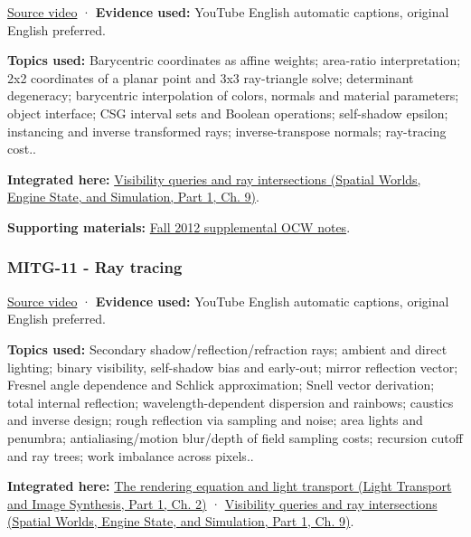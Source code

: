 \href{https://www.youtube.com/watch?v=gDayCevuE-U}{Source video} · \textbf{Evidence used:} YouTube English automatic captions, original English preferred.

\textbf{Topics used:} Barycentric coordinates as affine weights; area-ratio interpretation; 2x2 coordinates of a planar point and 3x3 ray-triangle solve; determinant degeneracy; barycentric interpolation of colors, normals and material parameters; object interface; CSG interval sets and Boolean operations; self-shadow epsilon; instancing and inverse transformed rays; inverse-transpose normals; ray-tracing cost..

\textbf{Integrated here:} \href{../05-Spatial-Worlds-Engine-State-and-Simulation-P01/main.pdf\#04-visual-computing-ii-ch028-visibility-queries-and-ray-intersections-1}{Visibility queries and ray intersections (Spatial Worlds, Engine State, and Simulation, Part 1, Ch. 9)}.

\textbf{Supporting materials:} \href{https://ocw.mit.edu/courses/6-837-computer-graphics-fall-2012/pages/lecture-notes/}{Fall 2012 supplemental OCW notes}.

\subsubsection{MITG-11 - Ray tracing}\label{04-visual-computing-ii-ch036-mitg-11---ray-tracing}

\hypertarget{04-visual-computing-ii-ch036-mitg-11---ray-tracing}{}

\href{https://www.youtube.com/watch?v=UL54Rf2O9RM}{Source video} · \textbf{Evidence used:} YouTube English automatic captions, original English preferred.

\textbf{Topics used:} Secondary shadow/reflection/refraction rays; ambient and direct lighting; binary visibility, self-shadow bias and early-out; mirror reflection vector; Fresnel angle dependence and Schlick approximation; Snell vector derivation; total internal reflection; wavelength-dependent dispersion and rainbows; caustics and inverse design; rough reflection via sampling and noise; area lights and penumbra; antialiasing/motion blur/depth of field sampling costs; recursion cutoff and ray trees; work imbalance across pixels..

\textbf{Integrated here:} \href{../04-Light-Transport-and-Image-Synthesis-P01/main.pdf\#03-visual-computing-i-ch007-the-rendering-equation-and-light-transport}{The rendering equation and light transport (Light Transport and Image Synthesis, Part 1, Ch. 2)} · \href{../05-Spatial-Worlds-Engine-State-and-Simulation-P01/main.pdf\#04-visual-computing-ii-ch028-visibility-queries-and-ray-intersections-1}{Visibility queries and ray intersections (Spatial Worlds, Engine State, and Simulation, Part 1, Ch. 9)}.

